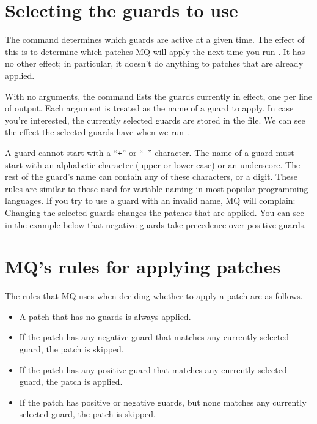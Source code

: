 \section{Selecting the guards to use}

The  command determines which guards are active at a
given time.  The effect of this is to determine which patches MQ will
apply the next time you run .  It has no other effect; in
particular, it doesn't do anything to patches that are already
applied.

With no arguments, the  command lists the guards
currently in effect, one per line of output.  Each argument is treated
as the name of a guard to apply.
In case you're interested, the currently selected guards are stored in
the  file.
We can see the effect the selected guards have when we run
.

A guard cannot start with a ``\texttt{+}'' or ``\texttt{-}''
character.  The name of a guard must start with an alphabetic
character (upper or lower case) or an underscore.  The rest of the
guard's name can contain any of these characters, or a digit.  These
rules are similar to those used for variable naming in most popular
programming languages.  If you try to use a guard with an invalid
name, MQ will complain:
Changing the selected guards changes the patches that are applied.
You can see in the example below that negative guards take precedence
over positive guards.

\section{MQ's rules for applying patches}

The rules that MQ uses when deciding whether to apply a patch
are as follows.
\begin{itemize}
\item A patch that has no guards is always applied.
\item If the patch has any negative guard that matches any currently
  selected guard, the patch is skipped.
\item If the patch has any positive guard that matches any currently
  selected guard, the patch is applied.
\item If the patch has positive or negative guards, but none matches
  any currently selected guard, the patch is skipped.
\end{itemize}

